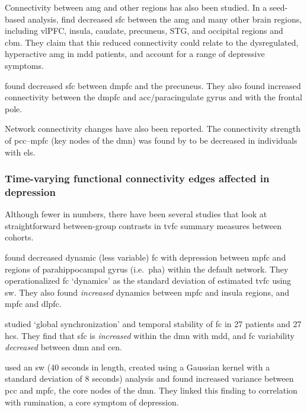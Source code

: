 Connectivity between \gls{amg} and other regions has also been studied.
In a seed-based analysis, \textcite{Ramasubbu2014} find decreased \gls{sfc} between the \gls{amg} and many other brain regions, including vlPFC, insula, caudate, precuneus, STG, and occipital regions and \gls{cbm}.
They claim that this reduced connectivity could relate to the dysregulated, hyperactive \gls{amg} in \gls{mdd} patients, and account for a range of depressive symptoms.

\textcite{Rzepa2018} found decreased \gls{sfc} between \gls{dmpfc} and the precuneus.
They also found increased connectivity between the \gls{dmpfc} and \gls{acc}/paracingulate gyrus and with the frontal pole.

Network connectivity changes have also been reported.
The connectivity strength of \gls{pcc}--\gls{mpfc} (key nodes of the \gls{dmn}) was found by \textcite{Philip2013} to be decreased in individuals with \gls{els}.

\subsubsection{Time-varying functional connectivity edges affected in depression}

Although fewer in numbers, there have been several studies that look at straightforward between-group contrasts in \gls{tvfc} summary measures between cohorts.

\textcite{Kaiser2015} found decreased dynamic (less variable) \gls{fc} with depression between \gls{mpfc} and regions of parahippocampal gyrus (i.e.~\gls{pha}) within the default network.
They operationalized \gls{fc} `dynamics' as the standard deviation of estimated \gls{tvfc} using \gls{sw}.
They also found \emph{increased} dynamics between \gls{mpfc} and insula regions, and \gls{mpfc} and \gls{dlpfc}.

\textcite{Demirtas2016} studied `global synchronization' and temporal stability of \gls{fc} in 27 patients and 27 \glspl{hc}.
They find that \gls{sfc} is \emph{increased} within the \gls{dmn} with \gls{mdd}, and \gls{fc} variability \emph{decreased} between \gls{dmn} and \gls{cen}.

\textcite{Wise2017} used an \gls{sw} (40 seconds in length, created using a Gaussian kernel with a standard deviation of 8 seconds) analysis and found increased variance between \gls{pcc} and \gls{mpfc}, the core nodes of the \gls{dmn}.
They linked this finding to correlation with rumination, a core symptom of depression.

